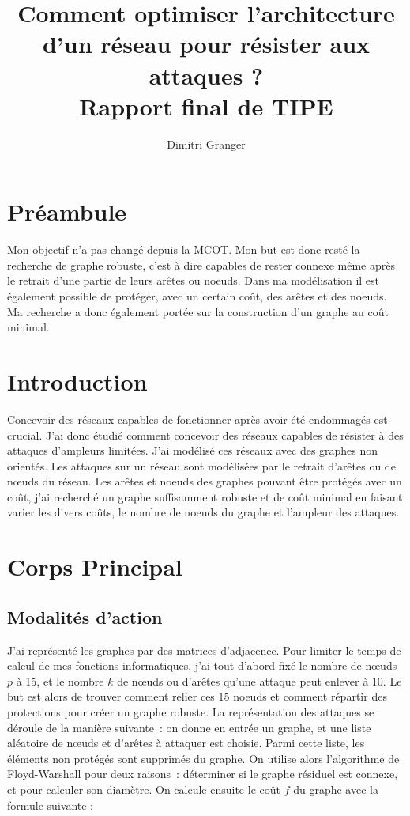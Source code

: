 \documentclass[12pt,a4paper]{article}
\title{Comment optimiser l'architecture d'un réseau pour résister aux attaques ?\\
Rapport final de TIPE}
\author{Dimitri Granger}
\begin{document}
\maketitle

\section{Préambule}
Mon objectif n'a pas changé depuis la MCOT. Mon but est donc resté la recherche de graphe robuste,
c'est à dire capables de rester connexe même après le retrait d'une partie de leurs arêtes ou noeuds. Dans ma 
modélisation il est également possible de protéger, avec un certain coût, des arêtes et des noeuds. Ma recherche a donc également portée sur la construction d'un graphe au coût minimal.

\section{Introduction}

Concevoir des réseaux capables de fonctionner après avoir été endommagés est crucial. J'ai donc étudié comment concevoir des réseaux capables de résister à des attaques d'ampleurs limitées.  J'ai modélisé ces réseaux avec des graphes non orientés. Les attaques sur un réseau sont modélisées par le retrait d'arêtes ou de nœuds du réseau. Les arêtes et noeuds des graphes pouvant être protégés avec un coût, j'ai recherché un graphe suffisamment robuste et de coût minimal en faisant varier les divers coûts, le nombre de noeuds du graphe et l'ampleur des attaques.



\section{Corps Principal}
\subsection{Modalités d'action}


J'ai représenté les graphes par des matrices d'adjacence. Pour limiter le temps de calcul de mes fonctions informatiques, j'ai tout d'abord fixé le nombre de nœuds $p$  à 15, et le nombre $k$ de nœuds ou d'arêtes qu'une attaque peut enlever à 10. Le but est alors de trouver comment relier ces 15 noeuds et comment répartir des protections pour créer un graphe robuste. La représentation des attaques se déroule de la manière suivante : on donne en entrée un graphe, et une liste aléatoire de nœuds et d'arêtes à attaquer est choisie. Parmi cette liste, les éléments non protégés sont supprimés du graphe. On utilise alors l'algorithme de Floyd-Warshall pour deux raisons : déterminer si le graphe résiduel est connexe, et pour calculer son diamètre. On calcule ensuite le coût $f$ du graphe avec la formule suivante :
\end{document}
